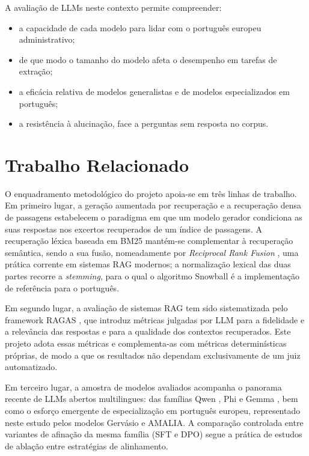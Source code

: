 \documentclass[11pt]{article}
\renewcommand{\_}{\textunderscore\allowbreak}
\begin{document}
A avaliação de LLMs neste contexto permite compreender:
\begin{itemize}
    \item a capacidade de cada modelo para lidar com o português europeu administrativo;
    \item de que modo o tamanho do modelo afeta o desempenho em tarefas de extração;
    \item a eficácia relativa de modelos generalistas e de modelos especializados em português;
    \item a resistência à alucinação, face a perguntas sem resposta no corpus.
\end{itemize}

\section{Trabalho Relacionado}
\label{sec:relacionado}

O enquadramento metodológico do projeto apoia-se em três linhas de trabalho. Em primeiro lugar, a geração aumentada por recuperação \cite{lewis} e a recuperação densa de passagens \cite{dpr} estabelecem o paradigma em que um modelo gerador condiciona as suas respostas nos excertos recuperados de um índice de passagens. A recuperação léxica baseada em BM25 \cite{bm25} mantém-se complementar à recuperação semântica, sendo a sua fusão, nomeadamente por \textit{Reciprocal Rank Fusion} \cite{rrf}, uma prática corrente em sistemas RAG modernos; a normalização lexical das duas partes recorre a \textit{stemming}, para o qual o algoritmo Snowball \cite{snowball} é a implementação de referência para o português.

Em segundo lugar, a avaliação de sistemas RAG tem sido sistematizada pelo framework RAGAS \cite{ragas}, que introduz métricas julgadas por LLM para a fidelidade e a relevância das respostas e para a qualidade dos contextos recuperados. Este projeto adota essas métricas e complementa-as com métricas determinísticas próprias, de modo a que os resultados não dependam exclusivamente de um juiz automatizado.

Em terceiro lugar, a amostra de modelos avaliados acompanha o panorama recente de LLMs abertos multilingues: das famílias Qwen \cite{qwen3}, Phi \cite{phi4} e Gemma \cite{gemma3}, bem como o esforço emergente de especialização em português europeu, representado neste estudo pelos modelos Gervásio e AMALIA. A comparação controlada entre variantes de afinação da mesma família (SFT e DPO) segue a prática de estudos de ablação entre estratégias de alinhamento.
\end{document}
